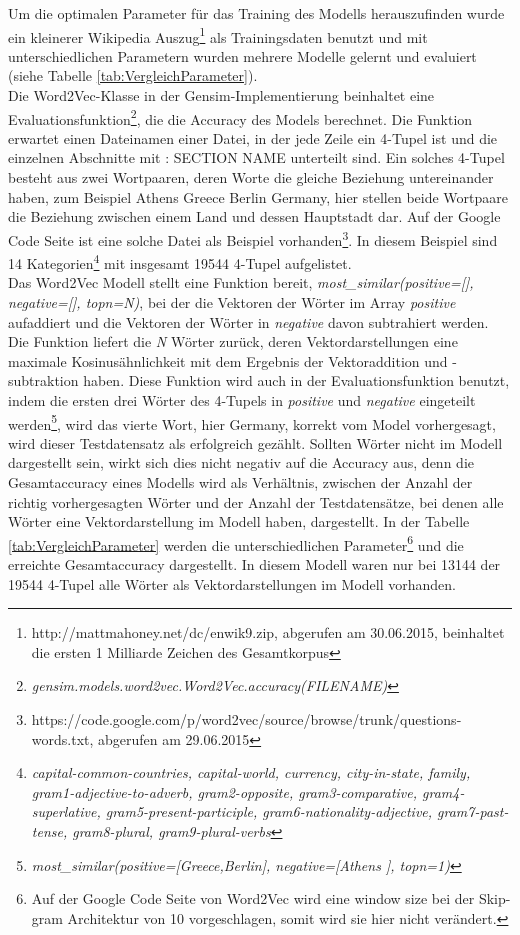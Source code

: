 \documentclass[12pt,a4paper]{report}
\begin{document}
Um die optimalen Parameter für das Training des Modells herauszufinden wurde ein kleinerer Wikipedia Auszug\footnote{http://mattmahoney.net/dc/enwik9.zip, abgerufen am 30.06.2015, beinhaltet die ersten 1 Milliarde Zeichen des Gesamtkorpus} als Trainingsdaten benutzt und mit unterschiedlichen Parametern wurden mehrere Modelle gelernt und evaluiert (siehe Tabelle \ref{tab:VergleichParameter}).\\
Die Word2Vec-Klasse in der Gensim-Implementierung beinhaltet eine Evaluationsfunktion\footnote{\textit{gensim.models.word2vec.Word2Vec.accuracy(FILENAME)}}, die die Accuracy des Models berechnet. Die Funktion erwartet einen Dateinamen einer Datei, in der jede Zeile ein 4-Tupel ist und die einzelnen Abschnitte mit \glqq : SECTION NAME\grqq{} unterteilt sind. Ein solches 4-Tupel besteht aus zwei Wortpaaren, deren Worte die gleiche Beziehung untereinander haben, zum Beispiel \glqq Athens Greece Berlin Germany\grqq , hier stellen beide Wortpaare die Beziehung zwischen einem Land und dessen Hauptstadt dar. Auf der Google Code Seite ist eine solche Datei als Beispiel vorhanden\footnote{https://code.google.com/p/word2vec/source/browse/trunk/questions-words.txt, abgerufen am 29.06.2015}. In diesem Beispiel sind 14 Kategorien\footnote{\textit{capital-common-countries, capital-world, currency, city-in-state, family, gram1-adjective-to-adverb, gram2-opposite, gram3-comparative, gram4-superlative, gram5-present-participle, gram6-nationality-adjective, gram7-past-tense, gram8-plural, gram9-plural-verbs}} mit insgesamt 19544 4-Tupel aufgelistet.\\
Das Word2Vec Modell stellt eine Funktion bereit, \textit{most\_similar(positive=[], negative=[], topn=N)}, bei der die Vektoren der Wörter im Array \textit{positive} aufaddiert und die Vektoren der Wörter in \textit{negative} davon subtrahiert werden. Die Funktion liefert die \textit{N} Wörter zurück, deren Vektordarstellungen eine maximale Kosinusähnlichkeit mit dem Ergebnis der Vektoraddition und -subtraktion haben. Diese Funktion wird auch in der Evaluationsfunktion benutzt, indem die ersten drei Wörter des 4-Tupels in \textit{positive} und \textit{negative} eingeteilt werden\footnote{\textit{most\_similar(positive=[\grq Greece\grq,\grq Berlin\grq], negative=[\grq Athens \grq], topn=1)}}, wird das vierte Wort, hier \glq Germany\grq, korrekt vom Model vorhergesagt, wird dieser Testdatensatz als erfolgreich gezählt. Sollten Wörter nicht im Modell dargestellt sein, wirkt sich dies nicht negativ auf die Accuracy aus, denn die Gesamtaccuracy eines Modells wird als Verhältnis, zwischen der Anzahl der richtig vorhergesagten Wörter und der Anzahl der Testdatensätze, bei denen alle Wörter eine Vektordarstellung im Modell haben, dargestellt. In der Tabelle \ref{tab:VergleichParameter} werden die unterschiedlichen Parameter\footnote{Auf der Google Code Seite von Word2Vec wird eine window size bei der Skip-gram Architektur von 10 vorgeschlagen, somit wird sie hier nicht verändert.} und die erreichte Gesamtaccuracy dargestellt. In diesem Modell waren nur bei 13144 der 19544 4-Tupel alle Wörter als Vektordarstellungen im Modell vorhanden.
\end{document}
